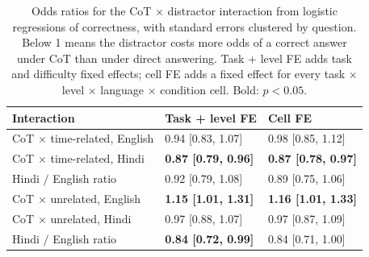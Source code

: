 \begin{table}[t]
\centering
\small
\setlength{\tabcolsep}{3pt}
\begin{tabular}{@{}lll@{}}
\toprule
Interaction & Task + level FE & Cell FE \\
\midrule
CoT $\times$ time-related, English & 0.94 [0.83, 1.07] & 0.98 [0.85, 1.12] \\
CoT $\times$ time-related, Hindi & \textbf{0.87 [0.79, 0.96]} & \textbf{0.87 [0.78, 0.97]} \\
\quad Hindi $/$ English ratio & 0.92 [0.79, 1.08] & 0.89 [0.75, 1.06] \\
CoT $\times$ unrelated, English & \textbf{1.15 [1.01, 1.31]} & \textbf{1.16 [1.01, 1.33]} \\
CoT $\times$ unrelated, Hindi & 0.97 [0.88, 1.07] & 0.97 [0.87, 1.09] \\
\quad Hindi $/$ English ratio & \textbf{0.84 [0.72, 0.99]} & 0.84 [0.71, 1.00] \\
\bottomrule
\end{tabular}
\caption{Odds ratios for the CoT $\times$ distractor interaction from logistic regressions of correctness, with standard errors clustered by question. Below 1 means the distractor costs more odds of a correct answer under CoT than under direct answering. Task + level FE adds task and difficulty fixed effects; cell FE adds a fixed effect for every task $\times$ level $\times$ language $\times$ condition cell. Bold: $p<0.05$.}
\label{tab:logit}
\end{table}
